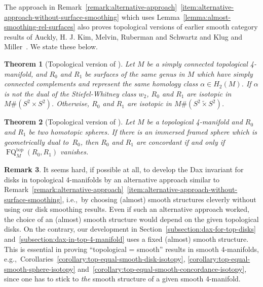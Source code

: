 \documentclass[11pt]{amsart}
\newtheorem{theorem}{Theorem}[section]
\theoremstyle{definition}
\newtheorem{remark}[theorem]{Remark}
\theoremstyle{theorem-giventitle}
\theoremstyle{definition-giventitle}
\numberwithin{equation}{section}
\def\top{\mathrm{top}}
\def\FQ{\operatorname{FQ}}
\begin{document}
The approach in Remark~\ref{remark:alternative-approach}~\ref{item:alternative-approach-without-surface-smoothing} which uses Lemma~\ref{lemma:almost-smoothing-rel-surfaces} also proves topological versions of earlier smooth category results of Auckly, H. J. Kim, Melvin, Ruberman and Schwartz \cite{Auckly-Kim-Melvin-Ruberman-Schwartz:2019-1}
and Klug and Miller~\cite{Klug-Miller:2021-1}.
We state these below.

\begin{theorem}[Topological version of \cite{Auckly-Kim-Melvin-Ruberman-Schwartz:2019-1}]
  Let $M$ be a simply connected topological 4-manifold, and 
  $R_0$ and $R_1$ be surfaces of the same genus in $M$ which have simply connected complements and represent the same homology class $\alpha\in H_2(M)$.
  If $\alpha$ is not the dual of the Stiefel-Whitney class $w_2$, $R_0$ and $R_1$ are isotopic in $M\# (S^2\times S^2)$.
  Otherwise, $R_0$ and $R_1$ are isotopic in $M\# (S^2 \widetilde\times S^2)$.
\end{theorem}

 \begin{theorem}[Topological version of \cite{Klug-Miller:2021-1}]
  Let $M$ be a topological 4-manifold and $R_{0}$ and $R_{1}$ be two homotopic spheres.
  If there is an immersed framed sphere which is geometrically dual to~$R_{0}$, then $R_{0}$ and $R_{1}$ are concordant if and only if $\FQ^\top_M(R_0,R_1)$ vanishes.
  \end{theorem}

\begin{remark} 
  It seems hard, if possible at all, to develop the Dax invariant for disks in topological 4-manifolds by an alternative approach similar to Remark~\ref{remark:alternative-approach}~\ref{item:alternative-approach-without-surface-smoothing}, i.e.,\ by choosing (almost) smooth structures cleverly without using our disk smoothing results.
  Even if such an alternative approach worked, the choice of an (almost) smooth structure would depend on the given topological disks.
  On the contrary, our development in Section~\ref{subsection:dax-for-top-disks} and~\ref{subsection:dax-in-top-4-manifold} uses a fixed (almost) smooth structure.
  This is essential in proving ``topological = smooth'' results in smooth 4-manifolds, e.g.,\ Corollaries~\ref{corollary:top-equal-smooth-disk-isotopy}, \ref{corollary:top-equal-smooth-sphere-isotopy} and~\ref{corollary:top-equal-smooth-concordance-isotopy}, since one has to stick to \emph{the} smooth structure of a given smooth 4-manifold.
\end{remark}
\end{document}
